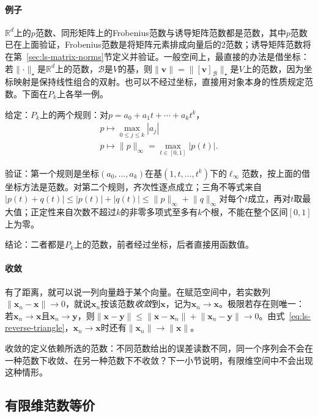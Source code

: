 \paragraph{例子}
$\mathbb R^d$上的$p$范数、同形矩阵上的Frobenius范数与诱导矩阵范数都是范数，其中$p$范数已在上面验证，Frobenius范数是将矩阵元素排成向量后的$2$范数；诱导矩阵范数将在第~\ref{sec:ls-matrix-norms}节定义并验证。一般空间上，最直接的办法是借坐标：若$\lVert\cdot\rVert_\star$是$\mathbb R^d$上的范数，$\mathcal B$是$V$的基，则$\lVert\bm v\rVert=\lVert[\bm v]_{\mathcal B}\rVert_\star$是$V$上的范数，因为坐标映射是保持线性组合的双射。也可以不经过坐标，直接用对象本身的性质规定范数。下面在$P_k$上各举一例。
\begin{example}[多项式空间上的两个范数]
\label{ex:ls-polynomial-norms}
给定：$P_k$上的两个规则：对$p=a_0+a_1t+\cdots+a_kt^k$，
\[
\begin{gathered}
p\mapsto\max_{0\leq j\leq k}|a_j|\\
p\mapsto\lVert p\rVert_\infty=\max_{t\in[0,1]}|p(t)| .
\end{gathered}
\]

验证：第一个规则是坐标$(a_0,\ldots,a_k)$在基$(1,t,\ldots,t^k)$下的$\ell_\infty$范数，按上面的借坐标方法是范数。对第二个规则，齐次性逐点成立；三角不等式来自$|p(t)+q(t)|\leq|p(t)|+|q(t)|\leq\lVert p\rVert_\infty+\lVert q\rVert_\infty$对每个$t$成立，再对$t$取最大值；正定性来自次数不超过$k$的非零多项式至多有$k$个根，不能在整个区间$[0,1]$上为零。

结论：二者都是$P_k$上的范数，前者经过坐标，后者直接用函数值。
\end{example}

\paragraph{收敛}
有了距离，就可以说一列向量趋于某个向量。在赋范空间中，若实数列$\lVert\bm x_n-\bm x\rVert\to0$，就说$\bm x_n$按该范数\emph{收敛}到$\bm x$，记为$\bm x_n\to\bm x$。极限若存在则唯一：若$\bm x_n\to\bm x$且$\bm x_n\to\bm y$，则$\lVert\bm x-\bm y\rVert\leq\lVert\bm x-\bm x_n\rVert+\lVert\bm x_n-\bm y\rVert\to0$。由式~\eqref{eq:ls-reverse-triangle}，$\bm x_n\to\bm x$时还有$\lVert\bm x_n\rVert\to\lVert\bm x\rVert$。

收敛的定义依赖所选的范数：不同范数给出的误差读数不同，同一个序列会不会在一种范数下收敛、在另一种范数下不收敛？下一小节说明，有限维空间中不会出现这种情形。

\subsection{有限维范数等价}
\label{sec:ls-finite-dimensional-sequences}
\label{sec:linear-algebra-sequence-convergence}
\label{sec:ls-error-scale-comparison}

